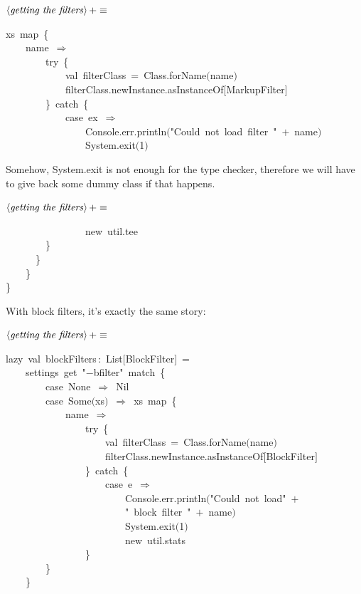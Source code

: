 \documentclass[a4paper,12pt]{article}
\begin{document}
$\left<\mbox{\emph{getting the filters}}\right>+\equiv$
\begin{program}xs~map~{\small\{}
\\~~~~name~$\Rightarrow$
\\~~~~~~~~{\vem try}~{\small\{}
\\~~~~~~~~~~~~{\vem val}~filterClass~=~Class.forName$($name$)$
\\~~~~~~~~~~~~filterClass.newInstance.asInstanceOf$[$MarkupFilter$]$
\\~~~~~~~~{\small\}}~{\vem catch}~{\small\{}
\\~~~~~~~~~~~~{\vem case}~ex~$\Rightarrow$
\\~~~~~~~~~~~~~~~~Console.err.println$($"Could~not~load~filter~"~$+$~name$)$
\\~~~~~~~~~~~~~~~~System.exit$($1$)$
\end{program}
Somehow, System.exit is not enough for the type checker, therefore we will
have to give back some dummy class if that happens.

$\left<\mbox{\emph{getting the filters}}\right>+\equiv$
\begin{program}~~~~~~~~~~~~~~~~{\vem new}~util.tee
\\~~~~~~~~{\small\}}
\\~~~~~~{\small\}}
\\~~~~{\small\}}
\\{\small\}}
\\[0.5em]\end{program}
With block filters, it's exactly the same story:

$\left<\mbox{\emph{getting the filters}}\right>+\equiv$
\begin{program}{\vem lazy}~{\vem val}~blockFilters\,{\rm :}~List$[$BlockFilter$]$~=
\\~~~~settings~get~"$-$bfilter"~{\vem match}~{\small\{}
\\~~~~~~~~{\vem case}~None~$\Rightarrow$~Nil
\\~~~~~~~~{\vem case}~Some$($xs$)$~$\Rightarrow$~xs~map~{\small\{}
\\~~~~~~~~~~~~name~$\Rightarrow$
\\~~~~~~~~~~~~~~~~{\vem try}~{\small\{}
\\~~~~~~~~~~~~~~~~~~~~{\vem val}~filterClass~=~Class.forName$($name$)$
\\~~~~~~~~~~~~~~~~~~~~filterClass.newInstance.asInstanceOf$[$BlockFilter$]$
\\~~~~~~~~~~~~~~~~{\small\}}~{\vem catch}~{\small\{}
\\~~~~~~~~~~~~~~~~~~~~{\vem case}~e~$\Rightarrow$
\\~~~~~~~~~~~~~~~~~~~~~~~~Console.err.println$($"Could~not~load"~$+$
\\~~~~~~~~~~~~~~~~~~~~~~~~"~block~filter~"~$+$~name$)$
\\~~~~~~~~~~~~~~~~~~~~~~~~System.exit$($1$)$
\\~~~~~~~~~~~~~~~~~~~~~~~~{\vem new}~util.stats
\\~~~~~~~~~~~~~~~~{\small\}}
\\~~~~~~~~{\small\}}
\\~~~~{\small\}}
\\[0.5em]\end{program}
\end{document}
